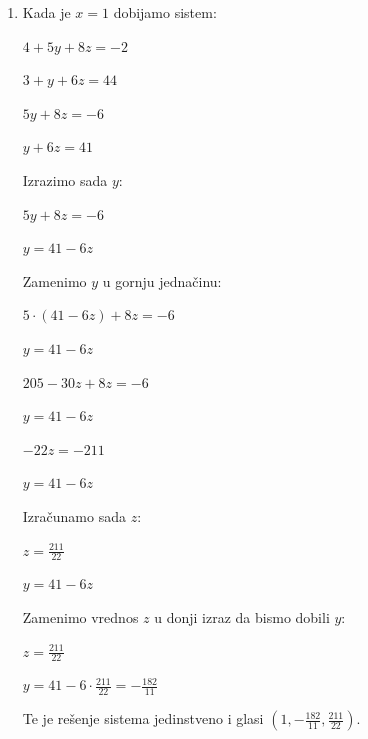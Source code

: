 \documentclass[a4paper,12pt]{report}
\begin{document}
\begin{enumerate}[1.]
\begin{enumerate}[1)]
\item Kada je $x = 1$ dobijamo sistem:
\begin{center}
\par $4 + 5y +8z = -2$
\par $3 + y + 6z = 44$
\end{center}
\begin{center}
\par $5y +8z = -6$
\par $y + 6z = 41$
\end{center}
\par Izrazimo sada $y$:
\begin{center}
\par $5y +8z = -6$
\par $y = 41 - 6z$
\end{center}
\par Zamenimo $y$ u gornju jedna\v{c}inu:
\begin{center}
\par $5 \cdot (41 - 6z) +8z = -6$
\par $y = 41 - 6z$
\end{center}
\begin{center}
\par $205 -30z +8z = -6$
\par $y = 41 - 6z$
\end{center}
\begin{center}
\par $-22z = -211$
\par $y = 41 - 6z$
\end{center}
\par Izra\v{c}unamo sada $z$:
\begin{center}
\par $z = \frac{211}{22}$
\par $y = 41 - 6z$
\end{center}
\par Zamenimo vrednos $z$ u donji izraz da bismo dobili $y$:
\begin{center}
\par $z = \frac{211}{22}$
\par $y = 41 - 6 \cdot \frac{211}{22} = - \frac{182}{11}  $
\end{center}
\par Te je re\v{s}enje sistema jedinstveno i glasi $(1,-\frac{182}{11}, \frac{211}{22})$.


\end{enumerate}
\end{enumerate}
\end{document}
